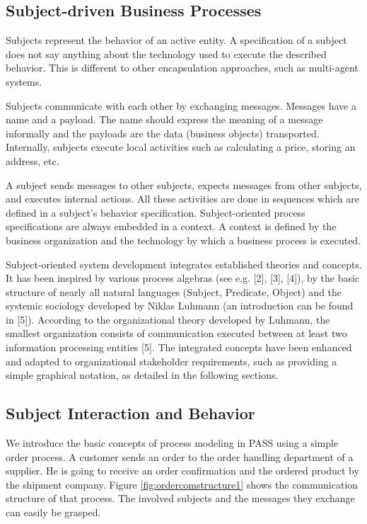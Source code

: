 \subsection{Subject-driven Business Processes}

Subjects represent the behavior of an active entity. A specification of a subject does not say anything about the technology used to execute the described behavior. This is different to other encapsulation approaches, such as multi-agent systems.

Subjects communicate with each other by exchanging messages. Messages have a name and a payload. The name should express the meaning of a message informally and the payloads are the data (business objects) transported. Internally, subjects execute local activities such as calculating a price, storing an address, etc.

A subject sends messages to other subjects, expects messages from other subjects, and executes internal actions. All these activities are done in sequences which are defined in a subject's behavior specification. Subject-oriented process specifications are always embedded in a context. A context is defined by the business organization and the technology by which a business process is executed.

Subject-oriented system development integrates established theories and concepts. It has been inspired by various process algebras (see e.g. [2], [3], [4]), by the basic structure of nearly all natural languages (Subject, Predicate, Object) and the systemic sociology developed by Niklas Luhmann (an introduction can be found in [5]). According to the organizational theory developed by Luhmann, the smallest organization consists of communication executed between at least two information processing entities [5]. The integrated concepts have been enhanced and adapted to organizational stakeholder requirements, such as providing a simple graphical notation, as detailed in the following sections.

\subsection{Subject Interaction and Behavior}

We introduce the basic concepts of process modeling in PASS using a simple order process. A customer sends an order to the order handling department of a supplier. He is going to receive an order confirmation and the ordered product by the shipment company. Figure \ref{fig:ordercomstructure1} shows the communication structure of that process. The involved subjects and the messages they exchange can easily be grasped. 

